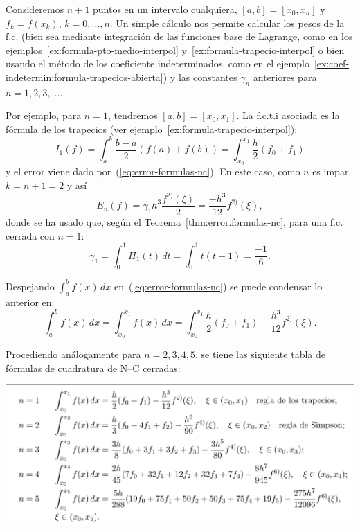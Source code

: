 \begin{example}
  Consideremos $n+1$ puntos en un intervalo cualquiera,
  $[a,b]=[x_{0},x_{n}]$ y $f_k=f(x_k)$, $k=0,\dots,n$. Un simple
  cálculo nos permite calcular los pesos de la f.c. (bien sea mediante
  integración de las funciones base de Lagrange, como en los
  ejemplos~\ref{ex:formula-pto-medio-interpol}
  y~\ref{ex:formula-trapecio-interpol} o bien usando el método de los
  coeficiente indeterminados, como en el
  ejemplo~\ref{ex:coef-indetermin:formula-trapecios-abierta}) y las
  constantes $\gamma_n$ anteriores para $n=1,2,3,...$.

  Por ejemplo, para $n=1$, tendremos $[a,b]=[x_0,x_1]$. La f.c.t.i
  asociada es la fórmula de los trapecios (ver
  ejemplo~\ref{ex:formula-trapecio-interpol}):
  \begin{equation*}
    I_1(f) = \int_{a}^{b} \frac{b-a}{2}(f(a)+f(b)) 
    = \int_{x_0}^{x_1} \frac{h}{2}(f_0+f_1)
  \end{equation*}
  y el error viene dado por~(\ref{eq:error-formulas-nc}). En este
  caso, como $n$ es impar, $k=n+1=2$ y así
  \begin{equation*}
    E_n(f)=\gamma_1 h^{3}\frac{f^{2)}(\xi)}{2}=\frac{-h^3}{12} f^{2)}(\xi),
  \end{equation*}
  donde se ha usado que, según el Teorema~\ref{thm:error.formulas-nc},
  para una f.c. cerrada con $n=1$:
  \begin{equation*}
    \gamma_1 = \int_0^1 \Pi_1(t)\,dt = \int_0^1 t(t-1) = \frac{-1}{6}.
  \end{equation*}
  
  Despejando $\int_a^b f(x)\,dx$ en~(\ref{eq:error-formulas-nc}) se
  puede condensar lo anterior en:
  \begin{equation*}
    \int_a^b f(x)\,dx = \int_{x_0}^{x_1} f(x)\,dx =
    \int_{x_0}^{x_1} \frac{h}{2}(f_0+f_1) - \frac{h^3}{12} f^{2)}(\xi).
  \end{equation*}

  Procediendo análogamente para $n=2,3,4,5$, se tiene las
  siguiente tabla de fórmulas de cuadratura de N--C cerradas:
  \begin{center}
    \includegraphics[width=0.95\linewidth]{tema3/formulas-nc-cerradas}
  \end{center}
\end{example}

